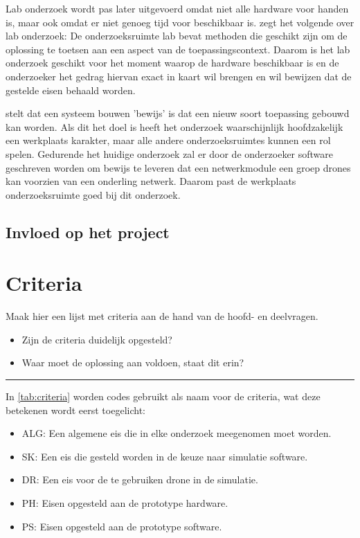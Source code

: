 \documentclass[a4paper, 11pt, oneside]{report}
\begin{document}
Lab onderzoek wordt pas later uitgevoerd omdat niet alle hardware voor handen is, maar ook omdat er niet genoeg tijd voor beschikbaar is.
\citeauthor{MethodenKaart} zegt het volgende over lab onderzoek: De onderzoeksruimte lab bevat methoden die geschikt zijn om de oplossing te toetsen aan een aspect van de toepassingscontext.
Daarom is het lab onderzoek geschikt voor het moment waarop de hardware beschikbaar is en de onderzoeker het gedrag hiervan exact in kaart wil brengen en wil bewijzen dat de gestelde eisen behaald worden.

 stelt dat een systeem bouwen 'bewijs' is dat een nieuw soort toepassing gebouwd kan worden. Als dit het doel is heeft het onderzoek waarschijnlijk hoofdzakelijk een werkplaats karakter, maar alle andere onderzoeksruimtes kunnen een rol spelen.
Gedurende het huidige onderzoek zal er door de onderzoeker software geschreven worden om bewijs te leveren dat een netwerkmodule een groep drones kan voorzien van een onderling netwerk.
Daarom past de werkplaats onderzoeksruimte goed bij dit onderzoek.


\section{Invloed op het project}



\chapter{Criteria}
\label{chapter:criteria}
Maak hier een lijst met criteria aan de hand van de hoofd- en deelvragen.
\begin{itemize}	
\item Zijn de criteria duidelijk opgesteld?
\item Waar moet de oplossing aan voldoen, staat dit erin?
\end{itemize}
\hrule

In \autoref{tab:criteria} worden codes gebruikt als naam voor de criteria, wat deze betekenen wordt eerst toegelicht:
\begin{itemize}
	\item ALG: Een algemene eis die in elke onderzoek meegenomen moet worden.
	\item SK: Een eis die gesteld worden in de keuze naar simulatie software.
	\item DR: Een eis voor de te gebruiken drone in de simulatie.
	\item PH: Eisen opgesteld aan de prototype hardware.
	\item PS: Eisen opgesteld aan de prototype software.
\end{itemize}
\end{document}
